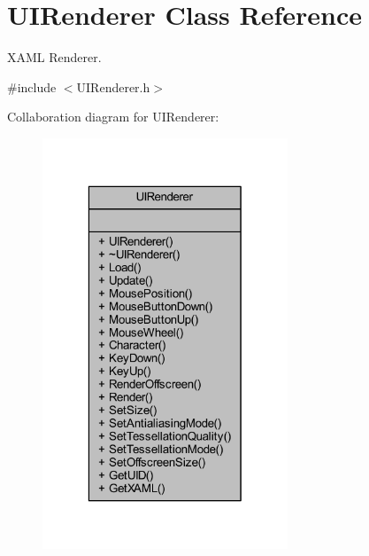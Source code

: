 \hypertarget{class_u_i_renderer}{\section{U\-I\-Renderer Class Reference}
\label{class_u_i_renderer}
}


X\-A\-M\-L Renderer.  




{\ttfamily \#include $<$U\-I\-Renderer.\-h$>$}



Collaboration diagram for U\-I\-Renderer\-:\nopagebreak
\begin{figure}[H]
\begin{center}
\leavevmode
\includegraphics[width=208pt]{class_u_i_renderer__coll__graph}
\end{center}
\end{figure}
